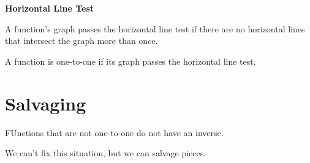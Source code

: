 \documentclass{ximera}
\begin{document}
\begin{example}
\begin{image}
\end{image}






\end{example}




\begin{definition} \textbf{\textcolor{green!50!black}{Horizontal Line Test}}  


A function's graph passes the horizontal line test if there are no horizontal lines that intersect the graph more than once.


A function is one-to-one if its graph passes the horizontal line test.

\end{definition}
















\section{Salvaging}


FUnctions that are not one-to-one do not have an inverse.

We can't fix this situation, but we can salvage pieces. \\
\end{document}
